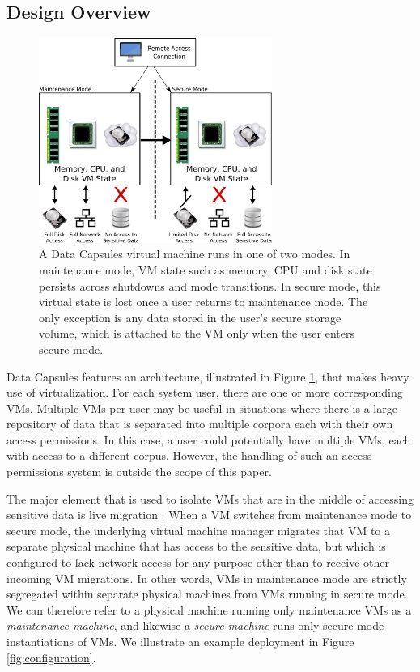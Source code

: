 \documentclass{acm_proc_article-sp}
\begin{document}
\subsection{Design Overview}

\begin{figure}[ht!]
\center
\includegraphics[width=3.0in]{figures/architecture}

\caption{A Data Capsules virtual machine runs in one of two modes.  In
maintenance mode, VM state such as memory, CPU and disk state persists across
shutdowns and mode transitions.  In secure mode, this virtual state is lost
once a user returns to maintenance mode. The only exception is any data stored
in the user's secure storage volume, which is attached to the VM only when the
user enters secure mode.}

\label{fig:architecture}
\end{figure}

Data Capsules features an architecture, illustrated in Figure
\ref{fig:architecture}, that makes heavy use of virtualization.  For each
system user, there are one or more corresponding VMs.  Multiple VMs per user
may be useful in situations where there is a large repository of data that is
separated into multiple corpora each with their own access permissions.  In
this case, a user could potentially have multiple VMs, each with access to a
different corpus.  However, the handling of such an access permissions system
is outside the scope of this paper.

The major element that is used to isolate VMs that are in the middle of
accessing sensitive data is live migration \cite{migration-clark}.  When a VM
switches from maintenance mode to secure mode, the underlying virtual machine
manager migrates that VM to a separate physical machine that has access to the
sensitive data, but which is configured to lack network access for any purpose
other than to receive other incoming VM migrations.  In other words, VMs in
maintenance mode are strictly segregated within separate physical machines from
VMs running in secure mode.  We can therefore refer to a physical machine
running only maintenance VMs as a \emph{maintenance machine}, and likewise a
\emph{secure machine} runs only secure mode instantiations of VMs.  We illustrate an example deployment in Figure \ref{fig:configuration}.
\end{document}
